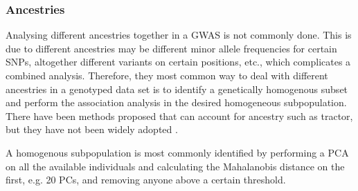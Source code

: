 \subsubsection{Ancestries}   
Analysing different ancestries together in a GWAS is not commonly done. This is due to different ancestries may be different minor allele frequencies for certain SNPs, altogether different variants on certain positions, etc., which complicates a combined analysis\cite{helgason2005icelandic}. Therefore, they most common way to deal with different ancestries in a genotyped data set is to identify a genetically homogenous subset and perform the association analysis in the desired homogeneous subpopulation. There have been methods proposed that can account for ancestry such as tractor, but they have not been widely adopted \cite{atkinson2021tractor}.

A homogenous subpopulation is most commonly identified by performing a PCA on all the available individuals and calculating the Mahalanobis distance on the first, e.g. 20 PCs, and removing anyone above a certain threshold\cite{prive2020efficient}. 

